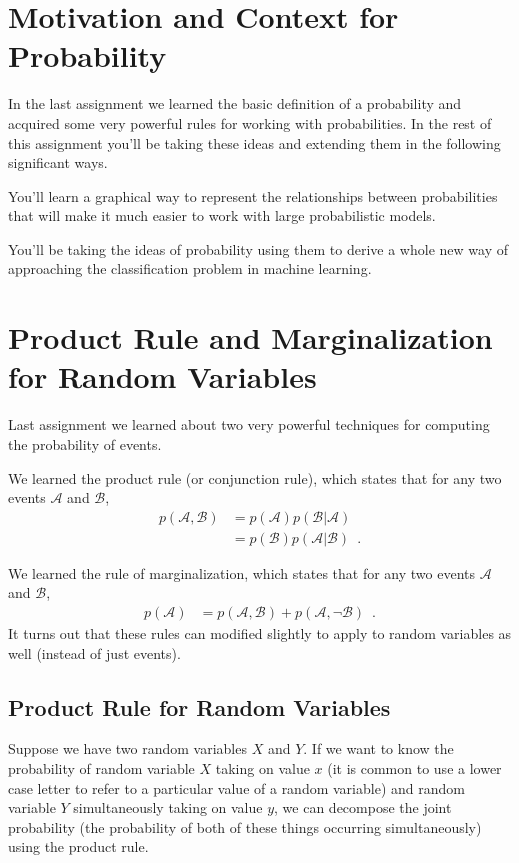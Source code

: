 \documentclass[assignment02_Solutions]{subfiles}
\begin{document}
\section{Motivation and Context for Probability}
In the last assignment we learned the basic definition of a probability and acquired some very powerful rules for working with probabilities.  In the rest of this assignment you'll be taking these ideas and extending them in the following significant ways.

\bi
\item You'll learn a graphical way to represent the relationships between probabilities that will make it much easier to work with large probabilistic models.
\item You'll be taking the ideas of probability using them to derive a whole new way of approaching the classification problem in machine learning.
\ei


\section{Product Rule and Marginalization for Random Variables}
\begin{recall}
Last assignment we learned about two very powerful techniques for computing the probability of events.
\bi
\item We learned the product rule (or conjunction rule), which states that for any two events $\mathcal{A}$ and $\mathcal{B}$,
\begin{align}
p(\mathcal{A}, \mathcal{B}) &= p(\mathcal{A}) p(\mathcal{B}|\mathcal{A}) \label{eq:prodcutruleevents} \\
&= p(\mathcal{B}) p(\mathcal{A}|\mathcal{B}) \enspace  . \nonumber
\end{align}
\item We learned the rule of marginalization, which states that for any two events $\mathcal{A}$ and $\mathcal{B}$,
\begin{align}
p(\mathcal{A}) &= p(\mathcal{A}, \mathcal{B}) + p(\mathcal{A}, \neg \mathcal{B}) \label{eq:marginalizationevents} \enspace .
\end{align}
\ei
It turns out that these rules can modified slightly to apply to random variables as well (instead of just events).
\end{recall}


\subsection{Product Rule for Random Variables}
Suppose we have two random variables $X$ and $Y$.  If we want to know the probability of random variable $X$ taking on value $x$ (it is common to use a lower case letter to refer to a particular value of a random variable) and random variable $Y$ simultaneously taking on value $y$, we can decompose the joint probability (the probability of both of these things occurring simultaneously) using the product rule.
\end{document}
